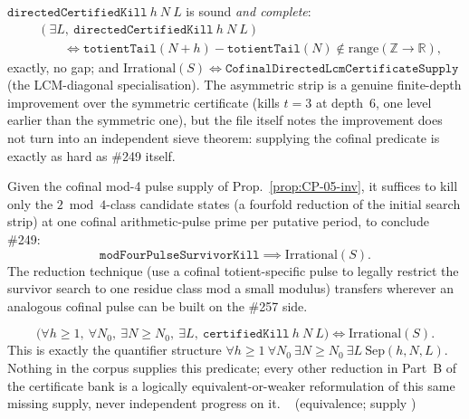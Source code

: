 \begin{prop}\label{prop:CP-06}
$\mathtt{directedCertifiedKill}\ h\ N\ L$ is sound \emph{and complete}:
\[
\begin{aligned}
&(\exists L,\ \mathtt{directedCertifiedKill}\ h\ N\ L) \\
&\qquad\iff
  \mathtt{totientTail}(N+h)-\mathtt{totientTail}(N)
  \notin \mathrm{range}(\mathbb Z\to\mathbb R),
\end{aligned}
\]
exactly, no gap; and $\mathrm{Irrational}(S)\iff \mathtt{CofinalDirectedLcmCertificateSupply}$ (the
LCM-diagonal specialisation). The asymmetric strip is a genuine finite-depth improvement over
the symmetric certificate (kills $t=3$ at depth~6, one level earlier than the symmetric one), but
the file itself notes the improvement does not turn into an independent sieve theorem: supplying
the cofinal predicate is exactly as hard as \#249 itself.
\ \ \\
\end{prop}

\begin{prop}\label{prop:CP-07}
Given the cofinal mod-4 pulse supply of Prop.~\ref{prop:CP-05-inv}, it suffices to kill only the
$2\bmod 4$-class candidate states (a fourfold reduction of the initial search strip) at one
cofinal arithmetic-pulse prime per putative period, to conclude \#249:
\[
\mathtt{modFourPulseSurvivorKill} \implies \mathrm{Irrational}(S).
\]
The reduction technique (use a cofinal totient-specific pulse to legally restrict the survivor
search to one residue class mod a small modulus) transfers wherever an analogous cofinal pulse
can be built on the \#257 side.
\ \ \\
\end{prop}

\begin{prop}\label{prop:A10}
\[
\big(\forall h\ge 1,\ \forall N_0,\ \exists N\ge N_0,\ \exists L,\ \mathtt{certifiedKill}\ h\ N\ L\big)
\iff \mathrm{Irrational}(S).
\]
This is exactly the quantifier structure $\forall h\ge1\ \forall N_0\ \exists N\ge N_0\ \exists L\ \mathrm{Sep}(h,N,L)$.
Nothing in the corpus supplies this predicate; every other reduction in Part~B
of the certificate bank is a logically equivalent-or-weaker reformulation of this same missing
supply, never independent progress on it.
\  (equivalence; supply )\ \\
\end{prop}


